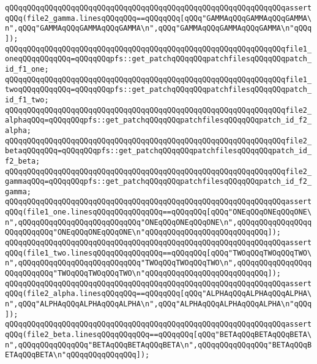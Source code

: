 \verb|qQQqqQQqqQQqqQQqqQQqqQQqqQQqqQQqqQQqqQQqqQQqqQQqqQQqqQQqqQQqqQQqassertqQQq(file2_gamma.linesqQQqqQQq==qQQqqQQq[qQQq"GAMMAqQQqGAMMAqQQqGAMMA\n",qQQq"GAMMAqQQqGAMMAqQQqGAMMA\n",qQQq"GAMMAqQQqGAMMAqQQqGAMMA\n"qQQq]);|\newline
\newline
\newline
\verb|qQQqqQQqqQQqqQQqqQQqqQQqqQQqqQQqqQQqqQQqqQQqqQQqqQQqqQQqqQQqqQQqfile1_oneqQQqqQQqqQQq=qQQqqQQqpfs::get_patchqQQqqQQqpatchfilesqQQqqQQqpatch_id_f1_one;|\newline
\verb|qQQqqQQqqQQqqQQqqQQqqQQqqQQqqQQqqQQqqQQqqQQqqQQqqQQqqQQqqQQqqQQqfile1_twoqQQqqQQqqQQq=qQQqqQQqpfs::get_patchqQQqqQQqpatchfilesqQQqqQQqpatch_id_f1_two;|\newline
\newline
\verb|qQQqqQQqqQQqqQQqqQQqqQQqqQQqqQQqqQQqqQQqqQQqqQQqqQQqqQQqqQQqqQQqfile2_alphaqQQq=qQQqqQQqpfs::get_patchqQQqqQQqpatchfilesqQQqqQQqpatch_id_f2_alpha;|\newline
\verb|qQQqqQQqqQQqqQQqqQQqqQQqqQQqqQQqqQQqqQQqqQQqqQQqqQQqqQQqqQQqqQQqfile2_betaqQQqqQQq=qQQqqQQqpfs::get_patchqQQqqQQqpatchfilesqQQqqQQqpatch_id_f2_beta;|\newline
\verb|qQQqqQQqqQQqqQQqqQQqqQQqqQQqqQQqqQQqqQQqqQQqqQQqqQQqqQQqqQQqqQQqfile2_gammaqQQq=qQQqqQQqpfs::get_patchqQQqqQQqpatchfilesqQQqqQQqpatch_id_f2_gamma;|\newline
\newline
\verb|qQQqqQQqqQQqqQQqqQQqqQQqqQQqqQQqqQQqqQQqqQQqqQQqqQQqqQQqqQQqqQQqassertqQQq(file1_one.linesqQQqqQQqqQQqqQQq==qQQqqQQq[qQQq"ONEqQQqONEqQQqONE\n",qQQqqQQqqQQqqQQqqQQqqQQqqQQq"ONEqQQqONEqQQqONE\n",qQQqqQQqqQQqqQQqqQQqqQQqqQQq"ONEqQQqONEqQQqONE\n"qQQqqQQqqQQqqQQqqQQqqQQqqQQq]);|\newline
\verb|qQQqqQQqqQQqqQQqqQQqqQQqqQQqqQQqqQQqqQQqqQQqqQQqqQQqqQQqqQQqqQQqassertqQQq(file1_two.linesqQQqqQQqqQQqqQQq==qQQqqQQq[qQQq"TWOqQQqTWOqQQqTWO\n",qQQqqQQqqQQqqQQqqQQqqQQqqQQq"TWOqQQqTWOqQQqTWO\n",qQQqqQQqqQQqqQQqqQQqqQQqqQQq"TWOqQQqTWOqQQqTWO\n"qQQqqQQqqQQqqQQqqQQqqQQqqQQq]);|\newline
\newline
\verb|qQQqqQQqqQQqqQQqqQQqqQQqqQQqqQQqqQQqqQQqqQQqqQQqqQQqqQQqqQQqqQQqassertqQQq(file2_alpha.linesqQQqqQQq==qQQqqQQq[qQQq"ALPHAqQQqALPHAqQQqALPHA\n",qQQq"ALPHAqQQqALPHAqQQqALPHA\n",qQQq"ALPHAqQQqALPHAqQQqALPHA\n"qQQq]);|\newline
\verb|qQQqqQQqqQQqqQQqqQQqqQQqqQQqqQQqqQQqqQQqqQQqqQQqqQQqqQQqqQQqqQQqassertqQQq(file2_beta.linesqQQqqQQqqQQq==qQQqqQQq[qQQq"BETAqQQqBETAqQQqBETA\n",qQQqqQQqqQQqqQQq"BETAqQQqBETAqQQqBETA\n",qQQqqQQqqQQqqQQq"BETAqQQqBETAqQQqBETA\n"qQQqqQQqqQQqqQQq]);|\newline
